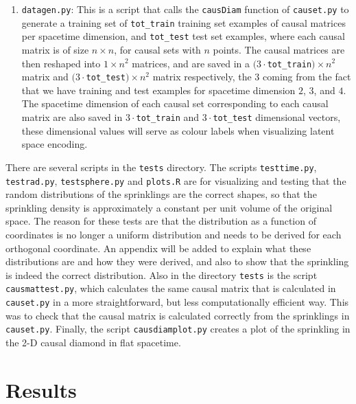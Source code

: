\documentclass[letterpaper,10pt]{article}
\def\code#1{\texttt{#1}}
\begin{document}
\begin{enumerate}
\begin{itemize}
 \end{itemize}
 
 \item \code{datagen.py}: This is a script that calls the \code{causDiam} function of \code{causet.py} to generate a training set of \code{tot\_train} 
 training set examples of causal matrices per spacetime dimension, and \code{tot\_test} test set examples, where each causal matrix is of size $n\times n$, 
 for causal sets with $n$ points.  The causal matrices are then reshaped into $1\times n^2$ matrices, and are saved in a 
 $(3\cdot$\code{tot\_train}$)\times n^2$ matrix and $(3\cdot$\code{tot\_test}$)\times n^2$ matrix respectively, the $3$ coming from the fact that we 
 have training and test examples for spacetime dimension $2$, $3$, and $4$.  The spacetime dimension of each causal set corresponding to each causal matrix 
 are also saved in $3\cdot$\code{tot\_train} and $3\cdot$\code{tot\_test} dimensional vectors, these dimensional values will serve as colour labels 
 when visualizing latent space encoding.

\end{enumerate}


There are several scripts in the \code{tests} directory.  The scripts \code{testtime.py}, \code{testrad.py}, \code{testsphere.py} and \code{plots.R} 
are for visualizing and testing that the random distributions of the sprinklings 
are the correct shapes, so that the sprinkling density is approximately a constant per unit volume of the original space.  The reason for these tests 
are that the distribution as a function of coordinates is no longer a uniform distribution and needs to be derived for each orthogonal coordinate.  
An appendix will be added to explain what these distributions are and how they were derived, and also to show that the sprinkling is indeed the correct 
distribution.  Also in the directory \code{tests} is the script \code{causmattest.py}, which calculates the same causal matrix that is calculated in 
\code{causet.py} in a more straightforward, but less computationally efficient way.  This was to check that the causal matrix is calculated correctly 
from the sprinklings in \code{causet.py}.  Finally, the script \code{causdiamplot.py} creates a plot of the sprinkling in the 2-D causal diamond in flat 
spacetime.


\section{Results} \label{results}
\end{document}
